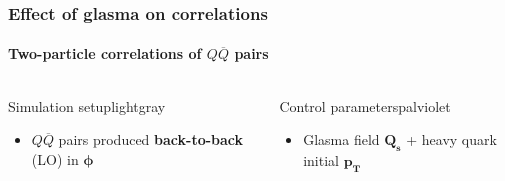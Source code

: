 \documentclass[aspectratio=169,11pt,usenames,dvipsnames]{beamer}
\begin{document}
\begin{frame}
    \frametitle{Effect of glasma on correlations}
    \framesubtitle{Two-particle correlations of $Q\overline{Q}$ pairs}
    \vspace{-15pt}
    \begin{center}
        \begin{columns}[onlytextwidth,t]
           \begin{center}
                \begin{custombox2}{\normalsize Simulation setup}{lightgray}
                    \small
                    \begin{varwidth}{\textwidth}
                    \begin{itemize}\itemsep0em 
                        \itemsep0em
                        \footnotesize
                        \item $Q\overline{Q}$ pairs produced {\bfseries back-to-back} (LO) in $\boldsymbol{\phi}$
                    \end{itemize}
                    \end{varwidth}
                \end{custombox2}
            \end{center}
            \begin{center}
                \begin{custombox2}{\normalsize Control parameters}{palviolet}
                    \small
                    \begin{varwidth}{0.95\textwidth}
                    \begin{itemize}\itemsep0em 
                        \itemsep0em
                        \footnotesize
                        \item Glasma field {\color{palviolet}$\boldsymbol{Q_s}$} + heavy quark initial {\color{palviolet}$\boldsymbol{p_T}$}
                    \end{itemize}
                    \end{varwidth}
                \end{custombox2}
            \end{center}
        \end{columns}    


\end{center}
\end{frame}
\end{document}
